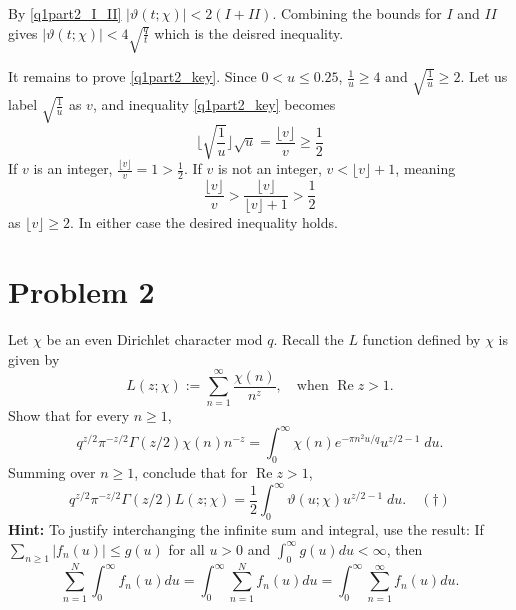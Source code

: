 \documentclass{article}
\theoremstyle{definition}
\theoremstyle{definition}
\theoremstyle{remark}
\renewcommand{\t}{\vartheta}
\newcommand{\x}{\chi}
\begin{document}
By \eqref{q1part2_I_II} $|\t(t;\x)| < 2(I + II)$. 
Combining the bounds for $I$ and $II$ gives $|\t(t;\x)| < 4 \sqrt{\frac{q}{t}}$ which is the deisred inequality.

It remains to prove \eqref{q1part2_key}. 
Since $0<u\leq 0.25$, $\frac{1}{u} \geq 4$ and $\sqrt{\frac{1}{u}} \geq 2$. 
Let us label $\sqrt{\frac{1}{u}}$ as $v$, and inequality \eqref{q1part2_key} becomes
$$
\lfloor \sqrt{\frac{1}{u}}\rfloor \sqrt{u}  = \frac{\lfloor v \rfloor}{v} \geq \frac{1}{2}
$$
If $v$ is an integer, 
$\frac{\lfloor v \rfloor}{v}  = 1 > \frac{1}{2}$.
If $v$ is not an integer, $v < \lfloor v \rfloor + 1$, meaning 
$$
\frac{\lfloor v \rfloor}{v} > \frac{\lfloor v \rfloor}{\lfloor v \rfloor + 1} > \frac{1}{2} 
$$
as $\lfloor v \rfloor \geq 2$. In either case the desired inequality holds.
\newpage












\section*{Problem 2}
Let $\chi$ be an even Dirichlet character mod $q$. Recall the $L$ function defined by $\chi$ is given by
\begin{equation*}
    L(z;\chi) := \sum_{n=1}^{\infty} \frac{\chi(n)}{n^z}, \quad \text{when } \operatorname{Re} z > 1.
\end{equation*}
Show that for every $n \geq 1$,
\begin{equation*}
    q^{z/2}\pi^{-z/2}\Gamma(z/2) \chi(n)n^{-z} = \int_{0}^{\infty} \chi(n)e^{-\pi n^2 u/q} u^{z/2-1} \;du.
\end{equation*}
Summing over $n \geq 1$, conclude that for $\operatorname{Re} z > 1$,
\begin{equation*}
    q^{z/2}\pi^{-z/2}\Gamma(z/2)L(z;\chi) = \frac{1}{2} \int_{0}^{\infty} \vartheta(u;\chi) u^{z/2-1} \; du. \quad (\dagger)
\end{equation*}
\textbf{Hint:} To justify interchanging the infinite sum and integral, use the result:
If $\sum_{n \geq 1} |f_n(u)| \leq g(u)$ for all $u > 0$ and $\int_0^{\infty} g(u)du < \infty$, then
\begin{equation*}
    \sum_{n=1}^{N} \int_0^{\infty} f_n(u) du = \int_0^{\infty} \sum_{n=1}^{N} f_n(u) du = \int_0^{\infty} \sum_{n=1}^{\infty} f_n(u) du.
\end{equation*}
\end{document}
